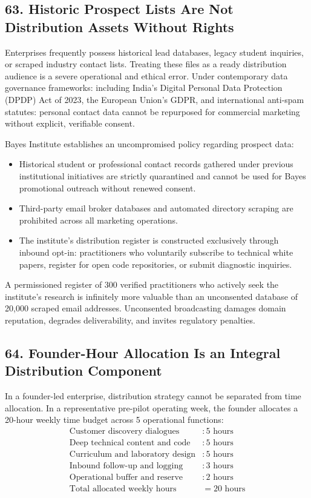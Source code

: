 \subsection*{63. Historic Prospect Lists Are Not Distribution Assets Without Rights}

Enterprises frequently possess historical lead databases, legacy student inquiries, or scraped industry contact lists. Treating these files as a ready distribution audience is a severe operational and ethical error. Under contemporary data governance frameworks: including India's Digital Personal Data Protection (DPDP) Act of 2023, the European Union's GDPR, and international anti-spam statutes: personal contact data cannot be repurposed for commercial marketing without explicit, verifiable consent.

Bayes Institute establishes an uncompromised policy regarding prospect data:
\begin{itemize}[leftmargin=*,itemsep=1pt]
  \item Historical student or professional contact records gathered under previous institutional initiatives are strictly quarantined and cannot be used for Bayes promotional outreach without renewed consent.
  \item Third-party email broker databases and automated directory scraping are prohibited across all marketing operations.
  \item The institute's distribution register is constructed exclusively through inbound opt-in: practitioners who voluntarily subscribe to technical white papers, register for open code repositories, or submit diagnostic inquiries.
\end{itemize}

A permissioned register of 300 verified practitioners who actively seek the institute's research is infinitely more valuable than an unconsented database of 20,000 scraped email addresses. Unconsented broadcasting damages domain reputation, degrades deliverability, and invites regulatory penalties.

\subsection*{64. Founder-Hour Allocation Is an Integral Distribution Component}

In a founder-led enterprise, distribution strategy cannot be separated from time allocation. In a representative pre-pilot operating week, the founder allocates a 20-hour weekly time budget across 5 operational functions:
\begin{align*}
  \text{Customer discovery dialogues} &: 5 \text{ hours} \\
  \text{Deep technical content and code} &: 5 \text{ hours} \\
  \text{Curriculum and laboratory design} &: 5 \text{ hours} \\
  \text{Inbound follow-up and logging} &: 3 \text{ hours} \\
  \text{Operational buffer and reserve} &: 2 \text{ hours} \\
  \hline
  \text{Total allocated weekly hours} &= 20 \text{ hours}
\end{align*}

